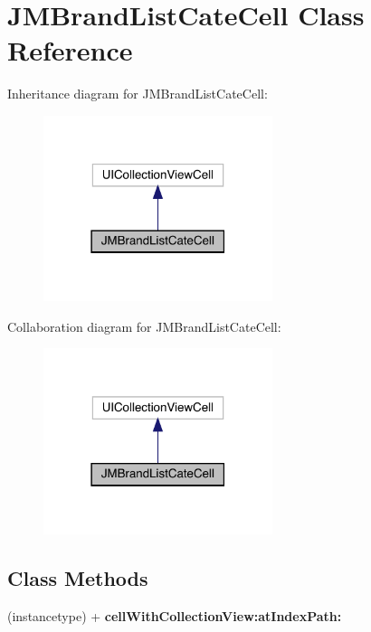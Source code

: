 \hypertarget{interface_j_m_brand_list_cate_cell}{}\section{J\+M\+Brand\+List\+Cate\+Cell Class Reference}
\label{interface_j_m_brand_list_cate_cell}


Inheritance diagram for J\+M\+Brand\+List\+Cate\+Cell\+:\nopagebreak
\begin{figure}[H]
\begin{center}
\leavevmode
\includegraphics[width=190pt]{interface_j_m_brand_list_cate_cell__inherit__graph}
\end{center}
\end{figure}


Collaboration diagram for J\+M\+Brand\+List\+Cate\+Cell\+:\nopagebreak
\begin{figure}[H]
\begin{center}
\leavevmode
\includegraphics[width=190pt]{interface_j_m_brand_list_cate_cell__coll__graph}
\end{center}
\end{figure}
\subsection*{Class Methods}
\begin{DoxyCompactItemize}
\item 
\mbox{\label{interface_j_m_brand_list_cate_cell_abe8e639ffd48d70a64a6239169978a43}} 
(instancetype) + {\bfseries cell\+With\+Collection\+View\+:at\+Index\+Path\+:}
\end{DoxyCompactItemize}
